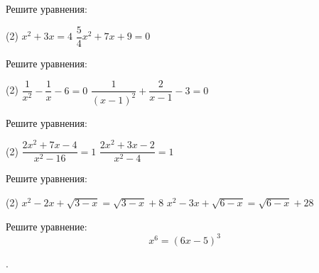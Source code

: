 %
%

\begin{class}[number=1]
	\begin{listofex}
		\item Решите уравнения:
		\begin{tasks}(2)
			\task \( x^2+3x=4 \)
			\task \( \dfrac{5}{4}x^2+7x+9=0 \)
		\end{tasks}
		\item Решите уравнения:
		\begin{tasks}(2)
			\task \( \dfrac{1}{x^2}-\dfrac{1}{x}-6=0 \)
			\task \( \dfrac{1}{(x-1)^2}+\dfrac{2}{x-1}-3=0 \)
		\end{tasks}
		\item Решите уравнения:
		\begin{tasks}(2)
			\task \( \dfrac{2x^2+7x-4}{x^2-16}=1 \)
			\task \( \dfrac{2x^2+3x-2}{x^2-4}=1 \)
		\end{tasks}
		\item Решите уравнения:
		\begin{tasks}(2)
			\task \( x^2-2x+\sqrt{3-x}=\sqrt{3-x}+8 \)
			\task \( x^2-3x+\sqrt{6-x}=\sqrt{6-x}+28 \)
		\end{tasks}
		\item Решите уравнение:
		\[x^6=(6x-5)^3\]
	\end{listofex}
\end{class}

\begin{class}[number=2]
	\begin{listofex}
	\item .
	\end{listofex}
\end{class}

